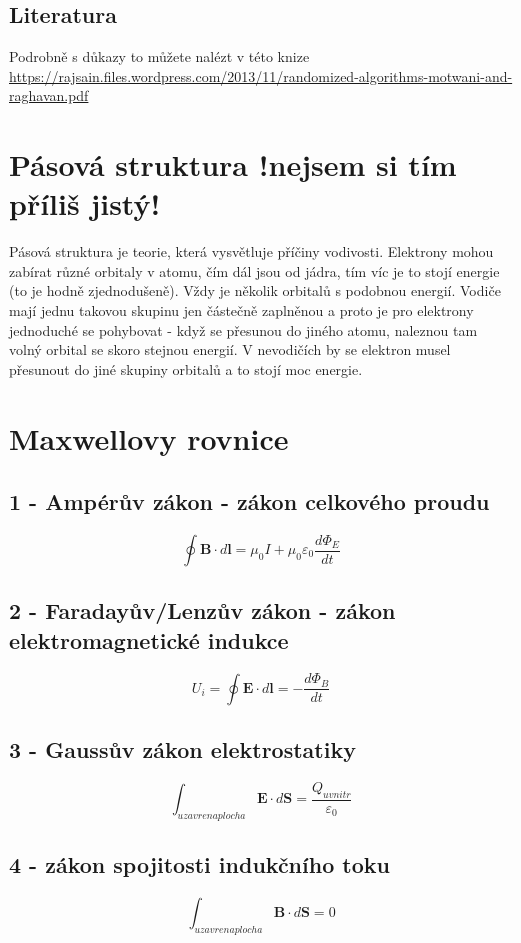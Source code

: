 \documentclass[titlepage]{report}
\begin{document}
\subsection{Literatura}
Podrobně s důkazy to můžete nalézt v této knize \\ \url{https://rajsain.files.wordpress.com/2013/11/randomized-algorithms-motwani-and-raghavan.pdf}
\section{Pásová struktura !nejsem si tím příliš jistý!}\label{sec:band}
Pásová struktura je teorie, která vysvětluje příčiny vodivosti. Elektrony mohou zabírat různé orbitaly v atomu, čím dál jsou od jádra, tím víc je to stojí energie (to je hodně zjednodušeně). Vždy je několik orbitalů s podobnou energií. Vodiče mají jednu takovou skupinu jen částečně zaplněnou a proto je pro elektrony jednoduché se pohybovat - když se přesunou do jiného atomu, naleznou tam volný orbital se skoro stejnou energií. V nevodičích by se elektron musel přesunout do jiné skupiny orbitalů a to stojí moc energie.
\section{Maxwellovy rovnice}
\subsection{1 - Ampérův zákon - zákon celkového proudu}
\begin{equation}
\oint \boldsymbol B \cdot d \boldsymbol l = \mu_0 I + \mu_0\varepsilon_0 \frac{d\Phi_E}{dt}
\end{equation}
\subsection{2 - Faradayův/Lenzův zákon - zákon elektromagnetické indukce}
\begin{equation}
U_{i} = \oint \boldsymbol E \cdot d \boldsymbol l = - \frac{d\Phi_B}{dt}
\end{equation}
\subsection{3 - Gaussův zákon elektrostatiky}
\begin{equation}
\int_{uzavrena plocha} \boldsymbol E \cdot d \boldsymbol S = \frac{Q_{uvnitr}}{\varepsilon_0}
\end{equation}
\subsection{4 - zákon spojitosti indukčního toku}
\begin{equation}
\int_{uzavrena plocha} \boldsymbol B \cdot d \boldsymbol S = 0
\end{equation}
\end{document}
